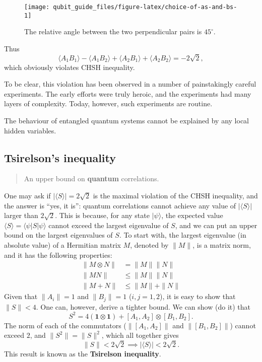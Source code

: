 \documentclass[fleqn]{article}
\newenvironment{idea}{\noindent}{\medskip}
\begin{document}
\begin{figure}[H]

{\centering \texttt{[image: qubit\_guide\_files/figure-latex/choice-of-as-and-bs-1]} 

}

\caption{The relative angle between the two perpendicular pairs is \(45^\circ\).}\label{fig:choice-of-as-and-bs}
\end{figure}

Thus
\[
  \langle A_1 B_1\rangle - \langle A_1 B_2\rangle + \langle A_2 B_1\rangle + \langle A_2 B_2\rangle
  = -2\sqrt{2},
\]
which obviously violates CHSH inequality.

To be clear, this violation has been observed in a number of painstakingly careful experiments.
The early efforts were truly heroic, and the experiments had many layers of complexity.
Today, however, such experiments are routine.

\begin{idea}
The behaviour of entangled quantum systems cannot be explained by any local hidden variables.

\end{idea}

\hypertarget{tsirelsons-inequality}{%
\subsection{Tsirelson's inequality}\label{tsirelsons-inequality}}

\begin{quote}
An upper bound on \textbf{quantum} correlations.
\end{quote}

One may ask if \(|\langle S\rangle|= 2\sqrt{2}\) is the maximal violation of the CHSH inequality, and the answer is ``yes, it is'': quantum correlations cannot achieve any value of \(|\langle S\rangle|\) larger than \(2\sqrt{2}\).
This is because, for any state \(|\psi\rangle\), the expected value \(\langle S\rangle = \langle\psi|S|\psi\rangle\) cannot exceed the largest eigenvalue of \(S\), and we can put an upper bound on the largest eigenvalues of \(S\).
To start with, the largest eigenvalue (in absolute value) of a Hermitian matrix \(M\), denoted by \(\|M\|\), is a matrix norm, and it has the following properties:
\[
\begin{aligned}
  \|M\otimes N\|
  & = \|M\| \|N\|
\\\|MN\|
  & \leqslant\|M\| \|N\|
\\\|M+N\|
  & \leqslant\|M\| + \|N\|
\end{aligned}
\]
Given that \(\|A_i\|=1\) and \(\|B_j\|=1\) (\(i,j=1,2\)), it is easy to show that \(\|S\| < 4\).
One can, however, derive a tighter bound.
We can show (do it) that
\[
  S^2
  = 4(\mathbf{1}\otimes\mathbf{1}) + [A_1,A_2]\otimes[B_1,B_2].
\]
The norm of each of the commutators (\(\|[A_1, A_2]\|\) and \(\|[B_1, B_2]\|\)) cannot exceed \(2\), and \(\|S^2\|=\|S\|^2\), which all together gives
\[
  \|S\|
  < 2\sqrt{2}
  \implies
  |\langle S\rangle| < 2\sqrt{2}.
\]
This result is known as the \textbf{Tsirelson inequality}.
\end{document}
